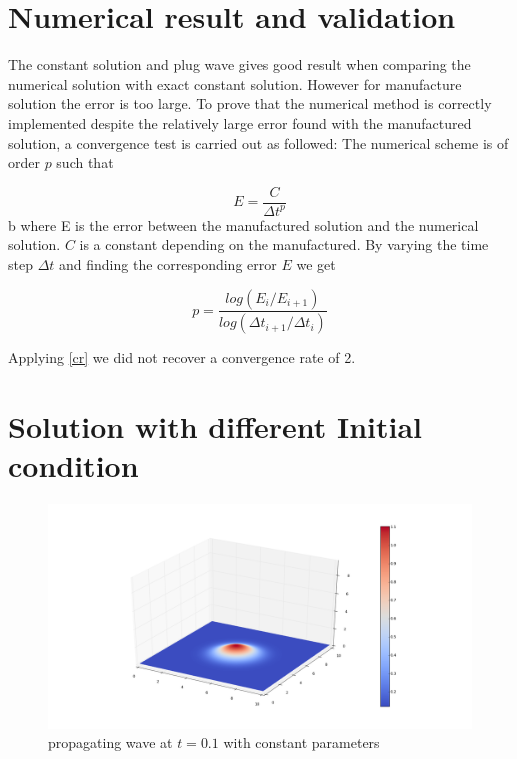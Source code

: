 \documentclass[10pt,a4paper]{report}
\begin{document}
\section{Numerical result and validation}
The constant solution and plug wave gives good result when comparing the numerical solution with exact constant solution. However for manufacture solution the error is too large. To prove that the numerical method is correctly implemented despite the relatively large error found with the manufactured solution, a convergence test is carried out as followed:
The numerical scheme is of order $p$ such that 

\begin{equation}
E = \frac{C}{\Delta t^{p}} \nonumber
\end{equation}b
where E is the error between the manufactured solution and the numerical solution. $C$ is a constant depending on the manufactured. By varying the time step $\Delta t$ and finding the corresponding error $E$ we get

\begin{equation}\label{cr}
p = \frac{ log(E_{i}/E_{i+1})}{log(\Delta t_{i+1}/ \Delta t_{i})}
\end{equation}

Applying \ref{cr} we did not recover a convergence rate of 2.

\section{Solution with different Initial condition}

\begin{figure}[h!]
  \caption{propagating wave at $t=0.1$ with constant parameters}
  \centering
    \includegraphics[width=1.5\textwidth]{t01.png}
\end{figure}
\end{document}
